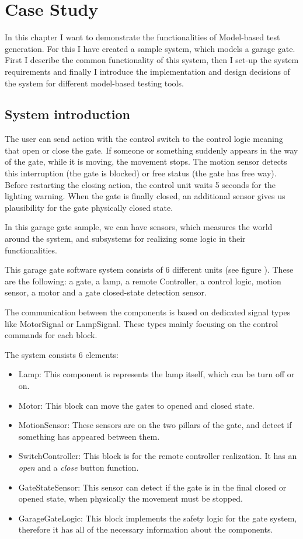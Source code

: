 \chapter{Case Study}\label{sect:case-study}
In this chapter I want to demonstrate the functionalities of Model-based test generation. For this I have created a sample system, which models a garage gate. First I describe the common functionality of this system, then I set-up the system requirements and finally I introduce the implementation and design decisions of the system for different model-based testing tools.

\section{System introduction}
The user can send action with the control switch to the control logic meaning that open or close the gate. If someone or something suddenly appears in the way of the gate, while it is moving, the movement stops. The motion sensor detects this interruption (the gate is blocked) or free status (the gate has free way). Before restarting the closing action, the control unit waits 5 seconds for the lighting warning. When the gate is finally closed, an additional sensor gives us plausibility for the gate physically closed state.

In this garage gate sample, we can have sensors, which measures the world around the system, and subsystems for realizing some logic in their functionalities.

This garage gate software system consists of 6 different units (see figure ). These are the following: a gate, a lamp, a remote Controller, a control logic, motion sensor, a motor and a gate closed-state detection sensor.

The communication between the components is based on dedicated signal types like MotorSignal or LampSignal. These types mainly focusing on the control commands for each block.

The system consists 6 elements:
\begin{itemize}
	\item Lamp: This component is represents the lamp itself, which can be turn off or on.
	\item Motor: This block can move the gates to opened and closed state.
	\item MotionSensor: These sensors are on the two pillars of the gate, and detect if something has appeared between them.
	\item SwitchController: This block is for the remote controller realization. It has an \textit{open} and a \textit{close} button function.
	\item GateStateSensor: This sensor can detect if the gate is in the final closed or opened state, when physically the movement must be stopped.
	\item GarageGateLogic: This block implements the safety logic for the gate system, therefore it has all of the necessary information about the components.
\end{itemize}

